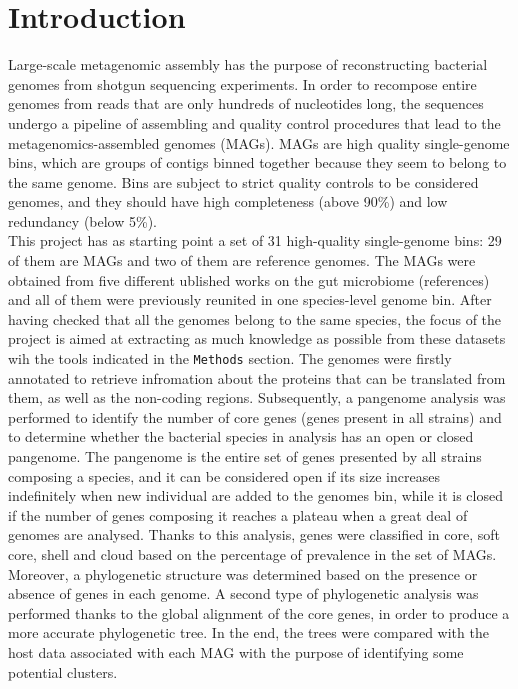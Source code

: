 \section*{Introduction}

Large-scale metagenomic assembly has the purpose of reconstructing bacterial genomes from shotgun sequencing experiments. In order to recompose entire genomes from reads that are only hundreds of nucleotides long, the sequences undergo a pipeline of assembling and quality control procedures that lead to the metagenomics-assembled genomes (MAGs). MAGs are high quality single-genome bins, which are groups of contigs binned together because they seem to belong to the same genome. Bins are subject to strict quality controls to be considered genomes, and they should have high completeness (above 90\%) and low redundancy (below 5\%).\\

This project has as starting point a set of 31 high-quality single-genome bins: 29 of them are MAGs and two of them are reference genomes. The MAGs were obtained from five different ublished works on the gut microbiome (references) and all of them were previously reunited in one species-level genome bin. After having checked that all the genomes belong to the same species, the focus of the project is aimed at extracting as much knowledge as possible from these datasets wih the tools indicated in the \texttt{Methods} section. The genomes were firstly annotated to retrieve infromation about the proteins that can be translated from them, as well as the non-coding regions. Subsequently, a pangenome analysis was performed to identify the number of core genes (genes present in all strains) and to determine whether the bacterial species in analysis has an open or closed pangenome. The pangenome is the entire set of genes presented by all strains composing a species, and it can be considered open if its size increases indefinitely when new individual are added to the genomes bin, while it is closed if the number of genes composing it reaches a plateau when a great deal of genomes are analysed. Thanks to this analysis, genes were classified in core, soft core, shell and cloud based on the percentage of prevalence in the set of MAGs. Moreover, a phylogenetic structure was determined based on the presence or absence of genes in each genome. A second type of phylogenetic analysis was performed thanks to the global alignment of the core genes, in order to produce a more accurate phylogenetic tree. In the end, the trees were compared with the host data associated with each MAG with the purpose of identifying some potential clusters. 